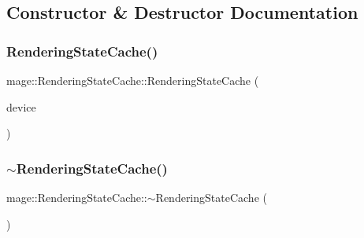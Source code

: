 \subsection{Constructor \& Destructor Documentation}
\hypertarget{structmage_1_1_rendering_state_cache_ad818eaa6c950c5851d6e684b9a4b3a65}{}\label{structmage_1_1_rendering_state_cache_ad818eaa6c950c5851d6e684b9a4b3a65} 
\subsubsection{\texorpdfstring{Rendering\+State\+Cache()}{RenderingStateCache()}\hspace{0.1cm}{\footnotesize\ttfamily [1/3]}}
{\footnotesize\ttfamily mage\+::\+Rendering\+State\+Cache\+::\+Rendering\+State\+Cache (\begin{DoxyParamCaption}\item[{I\+D3\+D11\+Device2 $\ast$}]{device }\end{DoxyParamCaption})}

\hypertarget{structmage_1_1_rendering_state_cache_a11b1c323310168153a60f5afef7def8d}{}\label{structmage_1_1_rendering_state_cache_a11b1c323310168153a60f5afef7def8d} 
\subsubsection{\texorpdfstring{$\sim$\+Rendering\+State\+Cache()}{~RenderingStateCache()}}
{\footnotesize\ttfamily mage\+::\+Rendering\+State\+Cache\+::$\sim$\+Rendering\+State\+Cache (\begin{DoxyParamCaption}{ }\end{DoxyParamCaption})\hspace{0.3cm}{\ttfamily [default]}}

\hypertarget{structmage_1_1_rendering_state_cache_a47c0f5527ce10ca9b6a059946efda239}{}\label{structmage_1_1_rendering_state_cache_a47c0f5527ce10ca9b6a059946efda239} 
